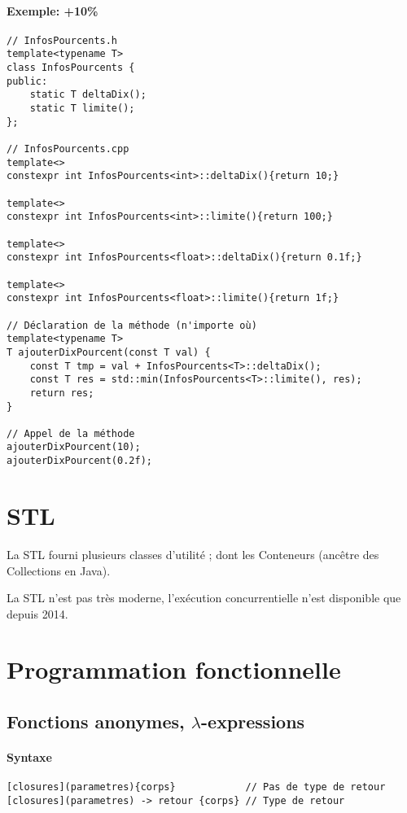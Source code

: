 \documentclass[10pt,a4paper,french]{article}
\begin{document}
\paragraph{Exemple: +10\%}
\begin{verbatim}
// InfosPourcents.h
template<typename T>
class InfosPourcents {
public:
    static T deltaDix();
    static T limite();
};

// InfosPourcents.cpp
template<>
constexpr int InfosPourcents<int>::deltaDix(){return 10;}

template<>
constexpr int InfosPourcents<int>::limite(){return 100;}

template<>
constexpr int InfosPourcents<float>::deltaDix(){return 0.1f;}

template<>
constexpr int InfosPourcents<float>::limite(){return 1f;}

// Déclaration de la méthode (n'importe où)
template<typename T>
T ajouterDixPourcent(const T val) {
    const T tmp = val + InfosPourcents<T>::deltaDix();
    const T res = std::min(InfosPourcents<T>::limite(), res);
    return res;
}

// Appel de la méthode
ajouterDixPourcent(10);
ajouterDixPourcent(0.2f);
\end{verbatim}

\section{STL}

La STL fourni plusieurs classes d'utilité ; dont les Conteneurs (ancêtre des Collections en Java).

La STL n'est pas très moderne, l'exécution concurrentielle n'est disponible que depuis 2014.

\section{Programmation fonctionnelle}

\subsection{Fonctions anonymes, $\lambda$-expressions}

\paragraph{Syntaxe}
\begin{verbatim}
[closures](parametres){corps}            // Pas de type de retour
[closures](parametres) -> retour {corps} // Type de retour
\end{verbatim}
\end{document}
